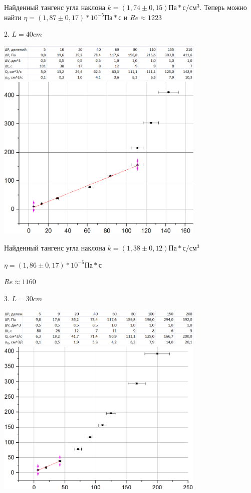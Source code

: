 \documentclass[12pt]{article}
\begin{document}
    Найденный тангенс угла наклона $k=(1,74 \pm 0,15) Па * с /см^3$. Теперь можно найти $\eta = (1,87 \pm 0,17) * 10^{-5} Па*с$ и $Re \approx 1223$
    
    2. $L = 40cm$
    
    \begin{center}
    	\includegraphics[width=10cm]{table2.png}
    	\includegraphics[width=10cm]{graph2.png}
    \end{center}
    
    Найденный тангенс угла наклона $k=(1,38 \pm 0,12) Па*с/см^3$
    
    $\eta = (1,86 \pm 0,17) * 10^{-5} Па*с$
    
    $Re \approx 1160$
    
    3. $L = 30cm$
    
    \begin{center}
    	\includegraphics[width=10cm]{table3.png}
    	\includegraphics[width=10cm]{graph3.png}
    \end{center}
    
\end{document}
